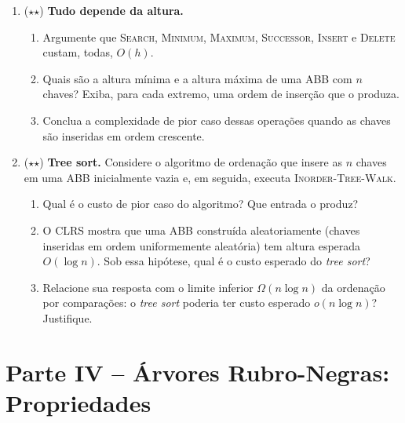 \documentclass[10pt,a4paper]{extarticle}
\newcommand{\impt}[1]{\textcolor{important}{#1}}
\newcommand{\ntc}[1]{\textcolor{notice}{#1}}
\begin{document}
\begin{enumerate}[label=\textbf{\arabic*.}, leftmargin=*, start=7]

\item \ntc{($\star$$\star$)} \textbf{Tudo depende da altura.}
  \begin{enumerate}[label=(\alph*)]
    \item Argumente que \textsc{Search}, \textsc{Minimum}, \textsc{Maximum}, \textsc{Successor}, \textsc{Insert} e \textsc{Delete} custam, todas, $O(h)$.
    \item Quais são a altura \impt{mínima} e a altura \impt{máxima} de uma ABB com $n$ chaves? Exiba, para cada extremo, uma ordem de inserção que o produza.
    \item Conclua a complexidade de pior caso dessas operações quando as chaves são inseridas em \impt{ordem crescente}.
  \end{enumerate}


\item \ntc{($\star$$\star$)} \textbf{Tree sort.} Considere o algoritmo de ordenação que insere as $n$ chaves em uma ABB inicialmente vazia e, em seguida, executa \textsc{Inorder-Tree-Walk}.
  \begin{enumerate}[label=(\alph*)]
    \item Qual é o custo de pior caso do algoritmo? Que entrada o produz?
    \item O CLRS mostra que uma ABB \impt{construída aleatoriamente} (chaves inseridas em ordem uniformemente aleatória) tem altura esperada $O(\log n)$. Sob essa hipótese, qual é o custo esperado do \emph{tree sort}?
    \item Relacione sua resposta com o limite inferior $\Omega(n \log n)$ da ordenação por comparações: o \emph{tree sort} poderia ter custo esperado $o(n \log n)$? Justifique.
  \end{enumerate}

\end{enumerate}

\section*{Parte IV -- Árvores Rubro-Negras: Propriedades}
\end{document}
